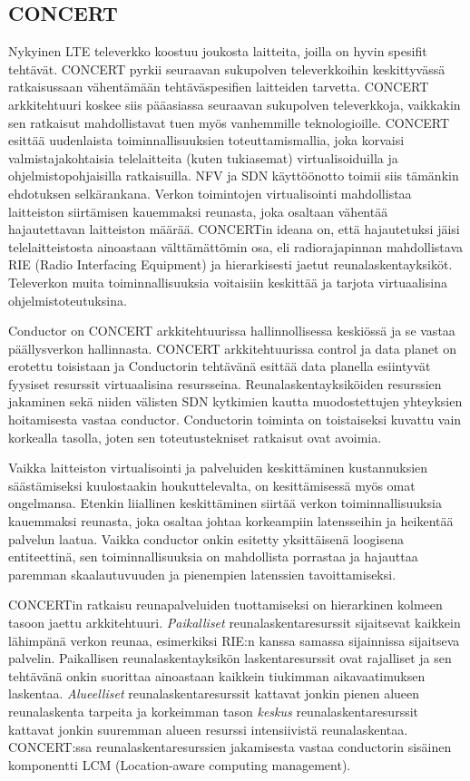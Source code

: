 \subsection{CONCERT} \label{concert}
Nykyinen LTE televerkko koostuu joukosta laitteita, joilla on hyvin spesifit tehtävät. CONCERT \cite{liu2014concert} pyrkii seuraavan sukupolven televerkkoihin keskittyvässä ratkaisussaan vähentämään tehtäväspesifien laitteiden tarvetta. 
CONCERT arkkitehtuuri koskee siis pääasiassa seuraavan sukupolven televerkkoja, vaikkakin sen ratkaisut mahdollistavat tuen myös vanhemmille teknologioille. CONCERT esittää uudenlaista toiminnallisuuksien toteuttamismallia, joka korvaisi valmistajakohtaisia telelaitteita (kuten tukiasemat) virtualisoiduilla ja ohjelmistopohjaisilla ratkaisuilla. NFV ja SDN käyttöönotto toimii siis tämänkin ehdotuksen selkärankana.
Verkon toimintojen virtualisointi mahdollistaa laitteiston siirtämisen kauemmaksi reunasta, joka osaltaan vähentää hajautettavan laitteiston määrää. CONCERTin ideana on, että hajautetuksi jäisi telelaitteistosta ainoastaan välttämättömin osa, eli radiorajapinnan mahdollistava RIE (Radio Interfacing Equipment) ja hierarkisesti jaetut reunalaskentayksiköt. Televerkon muita toiminnallisuuksia voitaisiin keskittää ja tarjota virtuaalisina ohjelmistoteutuksina. 

Conductor on CONCERT arkkitehtuurissa hallinnollisessa keskiössä ja se vastaa päällysverkon hallinnasta.
CONCERT arkkitehtuurissa control ja data planet on erotettu toisistaan ja Conductorin tehtävänä esittää data planella esiintyvät fyysiset resurssit virtuaalisina resursseina.
Reunalaskentayksiköiden resurssien jakaminen sekä niiden välisten SDN kytkimien kautta muodostettujen yhteyksien hoitamisesta vastaa conductor.
Conductorin toiminta on toistaiseksi kuvattu vain korkealla tasolla, joten sen toteutustekniset ratkaisut ovat avoimia.

Vaikka laitteiston virtualisointi ja palveluiden keskittäminen kustannuksien säästämiseksi kuulostaakin houkuttelevalta, on kesittämisessä myös omat ongelmansa.
Etenkin liiallinen keskittäminen siirtää verkon toiminnallisuuksia kauemmaksi reunasta, joka osaltaa johtaa korkeampiin latensseihin ja heikentää palvelun laatua. Vaikka conductor onkin esitetty yksittäisenä loogisena entiteettinä, sen toiminnallisuuksia on mahdollista porrastaa ja hajauttaa paremman skaalautuvuuden ja pienempien latenssien tavoittamiseksi.

CONCERTin ratkaisu reunapalveluiden tuottamiseksi on hierarkinen kolmeen tasoon jaettu arkkitehtuuri.
\textit{Paikalliset} reunalaskentaresurssit sijaitsevat kaikkein lähimpänä verkon reunaa, esimerkiksi RIE:n kanssa samassa sijainnissa sijaitseva palvelin. Paikallisen reunalaskentayksikön laskentaresurssit ovat rajalliset ja sen tehtävänä onkin suorittaa ainoastaan kaikkein tiukimman aikavaatimuksen laskentaa.
\textit{Alueelliset} reunalaskentaresurssit kattavat jonkin pienen alueen reunalaskenta tarpeita ja korkeimman tason \textit{keskus} reunalaskentaresurssit kattavat jonkin suuremman alueen resurssi intensiivistä reunalaskentaa.
CONCERT:ssa reunalaskentaresurssien jakamisesta vastaa conductorin sisäinen komponentti LCM (Location-aware computing management).



